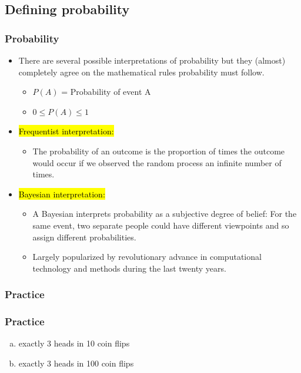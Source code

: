 
\subsection{Defining probability}


\begin{frame}
\frametitle{Probability}

\begin{itemize}

\item There are several possible interpretations of probability but they (almost) completely agree on the mathematical rules probability must follow.
\begin{itemize}
\item $P(A)$ = Probability of event A 
\item $0 \le P(A) \le 1$
\end{itemize}

\pause

\item \hl{Frequentist interpretation:} 
\begin{itemize}
\item The probability of an outcome is the proportion of times the outcome would occur if we observed the random process an infinite number of times.
\end{itemize}

\pause

\item \hl{Bayesian interpretation:} 
\begin{itemize}
\item  A Bayesian interprets probability as a subjective degree of belief: For the same event, two separate people could have different viewpoints and so assign different probabilities.
\item Largely popularized by revolutionary advance in computational technology and methods during the last twenty years.
\end{itemize}

\end{itemize}

\end{frame}


\begin{frame}
\frametitle{Practice}
\frametitle{Practice}


\begin{enumerate}[(a)]
\item exactly 3 heads in 10 coin flips
\item exactly 3 heads in 100 coin flips
\end{enumerate}

\end{frame}

